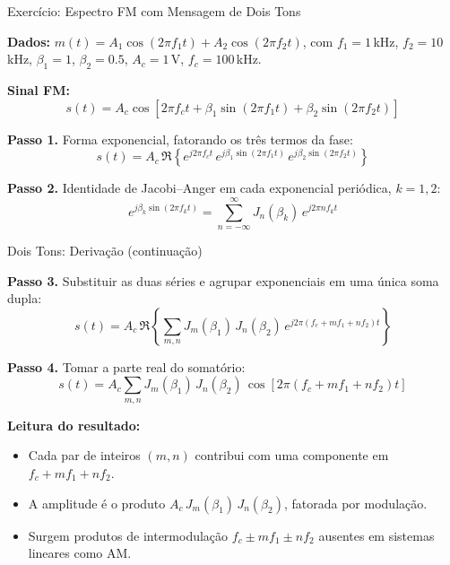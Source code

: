 
\begin{frame}{Exercício: Espectro FM com Mensagem de Dois Tons}

\footnotesize
\textbf{Dados:} $m(t) = A_1\cos(2\pi f_1 t) + A_2\cos(2\pi f_2 t)$, com $f_1 = 1$\,kHz, $f_2 = 10$\,kHz, $\beta_1 = 1$, $\beta_2 = 0.5$, $A_c = 1$\,V, $f_c = 100$\,kHz.

\textbf{Sinal FM:}
\[
s(t) = A_c \cos[2\pi f_c t + \beta_1\sin(2\pi f_1 t) + \beta_2\sin(2\pi f_2 t)]
\]

\pause
\textbf{Passo 1.} Forma exponencial, fatorando os três termos da fase:
\[
s(t) = A_c\,\Re\!\left\{ e^{j2\pi f_c t}\, e^{j\beta_1\sin(2\pi f_1 t)}\, e^{j\beta_2\sin(2\pi f_2 t)} \right\}
\]

\pause
\textbf{Passo 2.} Identidade de Jacobi--Anger em cada exponencial periódica, $k = 1, 2$:
\[
e^{j\beta_k\sin(2\pi f_k t)} = \sum_{n=-\infty}^{\infty} J_n(\beta_k)\,e^{j2\pi n f_k t}
\]

\end{frame}


\begin{frame}{Dois Tons: Derivação (continuação)}

\footnotesize
\textbf{Passo 3.} Substituir as duas séries e agrupar exponenciais em uma única soma dupla:
\[
s(t) = A_c\,\Re\!\left\{ \sum_{m,n} J_m(\beta_1)\, J_n(\beta_2)\, e^{j2\pi(f_c + m f_1 + n f_2)t} \right\}
\]

\pause
\textbf{Passo 4.} Tomar a parte real do somatório:
\[
\boxed{\;s(t) = A_c\!\!\sum_{m,n}\!\! J_m(\beta_1)\, J_n(\beta_2)\, \cos[2\pi(f_c + m f_1 + n f_2)t]\;}
\]

\pause
\vspace{0.2cm}
\textbf{Leitura do resultado:}
\begin{itemize}\itemsep0pt
\item Cada par de inteiros $(m, n)$ contribui com uma componente em $f_c + m f_1 + n f_2$.
\item A amplitude é o produto $A_c\, J_m(\beta_1)\, J_n(\beta_2)$, fatorada por modulação.
\item Surgem produtos de intermodulação $f_c \pm m f_1 \pm n f_2$ ausentes em sistemas lineares como AM.
\end{itemize}

\end{frame}

